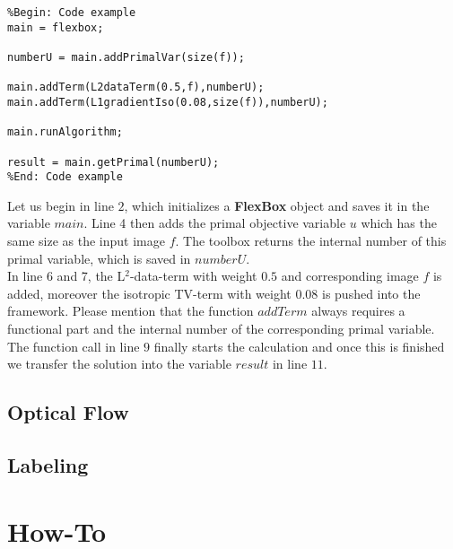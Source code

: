 \documentclass[final,leqno,onefignum,onetabnum]{article}
\newcommand{\1}[1]{\mathds{1}_{#1}}
\begin{document}
\begin{lstlisting} 
%Begin: Code example
main = flexbox;

numberU = main.addPrimalVar(size(f));

main.addTerm(L2dataTerm(0.5,f),numberU);
main.addTerm(L1gradientIso(0.08,size(f)),numberU);

main.runAlgorithm;

result = main.getPrimal(numberU);
%End: Code example
\end{lstlisting}
Let us begin in line $2$, which initializes a \textbf{FlexBox} object and saves it in the variable $main$. Line 4 then adds the primal objective variable $u$ which has the same size as the input image $f$. The toolbox returns the internal number of this primal variable, which is saved in $numberU$. \\
In line 6 and 7, the L$^2$-data-term with weight $0.5$ and corresponding image $f$ is added, moreover the isotropic TV-term with weight $0.08$ is pushed into the framework. Please mention that the function $addTerm$ always requires a functional part and the internal number of the corresponding primal variable. \\
The function call in line $9$ finally starts the calculation and once this is finished we transfer the solution into the variable $result$ in line $11$. 

\subsection{Optical Flow}

\subsection{Labeling}

\section{How-To}
\end{document}
